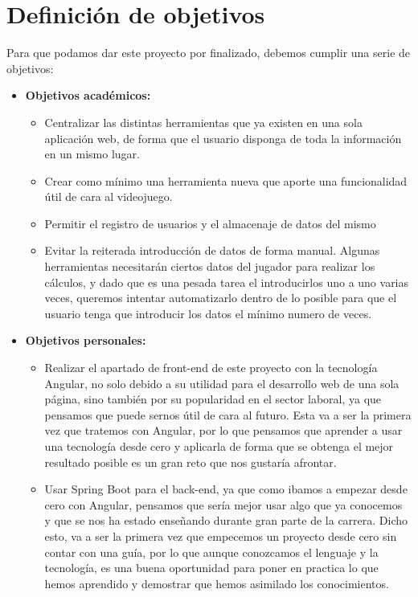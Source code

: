 \chapter{Definici\'on de objetivos}\label{defobjetivos}

Para que podamos dar este proyecto por finalizado, debemos cumplir una serie de objetivos:

\begin{itemize}
	\item \textbf{Objetivos académicos:}
	\begin{itemize}
		\item Centralizar las distintas herramientas que ya existen en una sola aplicación web, de forma que el usuario disponga de toda la información en un mismo lugar.
		
		\item Crear como mínimo una herramienta nueva que aporte una funcionalidad útil de cara al videojuego.
		
		\item Permitir el registro de usuarios y el almacenaje de datos del mismo
		
		\item Evitar la reiterada introducción de datos de forma manual. Algunas herramientas necesitarán ciertos datos del jugador para realizar los cálculos, y dado que es una pesada tarea el introducirlos uno a uno varias veces, queremos intentar automatizarlo dentro de lo posible para que el usuario tenga que introducir los datos el mínimo numero de veces.
	\end{itemize}
	\item \textbf{Objetivos personales:}
	\begin{itemize}
		\item Realizar el apartado de front-end de este proyecto con la tecnología Angular, no solo debido a su utilidad para el desarrollo web de una sola página, sino también por su popularidad en el sector laboral, ya que pensamos que puede sernos útil de cara al futuro. Esta va a ser la primera vez que tratemos con Angular, por lo que pensamos que aprender a usar una tecnología desde cero y aplicarla de forma que se obtenga el mejor resultado posible es un gran reto que nos gustaría afrontar.
		\item Usar Spring Boot para el back-end, ya que como ibamos a empezar desde cero con Angular, pensamos que sería mejor usar algo que ya conocemos y que se nos ha estado enseñando durante gran parte de la carrera. Dicho esto, va a ser la primera vez que empecemos un proyecto desde cero sin contar con una guía, por lo que aunque conozcamos el lenguaje y la tecnología, es una buena oportunidad para poner en practica lo que hemos aprendido y demostrar que hemos asimilado los conocimientos.
	\end{itemize}
\end{itemize}






	
